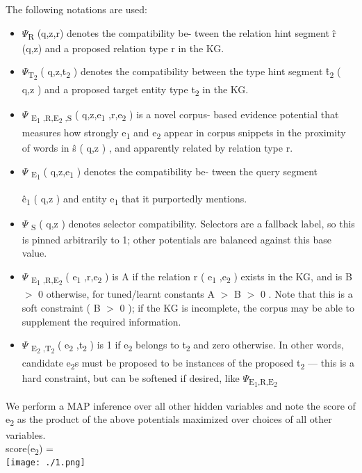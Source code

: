 The following notations are used:
\begin{itemize}


\item
$ \Psi $\textsubscript{R}
(q,z,r)
denotes   the   compatibility   be-
tween  the  relation  hint  segment
\^{r} (q,z)
and
a proposed relation type
r
in the KG.
\item 
$ \Psi $\textsubscript{T\textsubscript{2}}
(
q,z,t\textsubscript{2}
)
denotes  the  compatibility  between  the  type  hint  segment
\^{t\textsubscript{2}}
(
q,z
)
and  a
proposed  target  entity  type
t\textsubscript{2}
in  the KG.
\item
$ \Psi $\textsubscript{
E\textsubscript{1}
,R,E\textsubscript{2}
,S}
(
q,z,e\textsubscript{1}
,r,e\textsubscript{2}
)
is a novel corpus-
based evidence potential that measures how
strongly
e\textsubscript{1}
and
e\textsubscript{2}
appear in corpus snippets
in the proximity of words in
\^{s}
(
q,z
)
, and apparently related by relation type
r.
\item
$ \Psi $\textsubscript{
E\textsubscript{1}}
(
q,z,e\textsubscript{1}
)
denotes  the  compatibility  be-
tween the query segment

\^{e\textsubscript{1}}
(
q,z
)
and entity
e\textsubscript{1}
that it purportedly mentions.
\item
$ \Psi $\textsubscript{
S}
(
q,z
)
denotes selector compatibility.  Selectors are a fallback label, so this is pinned
arbitrarily to 1; other potentials are balanced
against this base value.
\item
$ \Psi $
\textsubscript{E\textsubscript{1}
,R,E\textsubscript{2}}
(
e\textsubscript{1}
,r,e\textsubscript{2}
)
is
A
if   the   relation
r
(
e\textsubscript{1}
,e\textsubscript{2}
)
exists in the KG, and is
B $>$
0
otherwise, for tuned/learnt constants
A $>$ B $>$ 0
. Note that this is a soft constraint (
B $>$
0
);
if the KG is incomplete, the corpus may be
able to supplement the required information.
\item
$ \Psi $\textsubscript{
E\textsubscript{2}
,T\textsubscript{2}}
(
e\textsubscript{2}
,t\textsubscript{2}
)
is  1  if
e\textsubscript{2}
belongs  to
t\textsubscript{2}
and
zero otherwise. In other words, candidate
e\textsubscript{2}s
must be proposed to be instances of the proposed
t\textsubscript{2}
— this is a hard constraint, but can
be softened if desired, like
$ \Psi $\textsubscript{E\textsubscript{1},R,E\textsubscript{2}}
\end{itemize}

We perform a MAP inference over all other hidden
variables and note the score of
e\textsubscript{2}
as the product of
the above potentials maximized over choices of all
other variables.\\
score(e\textsubscript{2}) = \\
\texttt{[image: ./1.png]}


